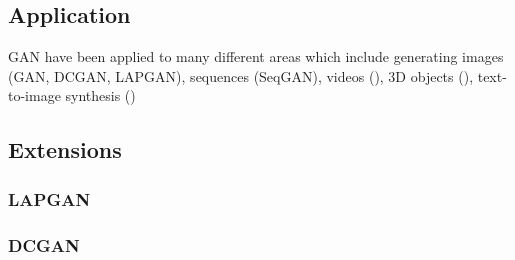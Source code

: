 \subsection{Application}
\label{sub:gan_application}
GAN have been applied to many different areas which include generating images (GAN, DCGAN, LAPGAN), sequences (SeqGAN), videos (\cite{gan_video:2016}), 3D objects (\cite{gan_3d:2016}), text-to-image synthesis (\cite{gan_t2i:2016})
\subsection{Extensions}
\label{sub:gan_extensions}

\subsubsection{LAPGAN}
\label{ssub:lapgan}

\subsubsection{DCGAN}
\label{ssub:dcgan}


